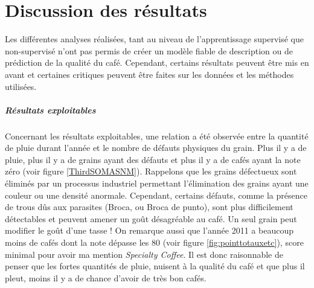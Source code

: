 \chapter{Discussion des résultats}










Les différentes analyses réalisées, tant au niveau de l'apprentissage supervisé que non-supervisé n'ont pas permis de créer un modèle fiable de description ou de prédiction de la qualité du café. Cependant, certains résultats peuvent être mis en avant et certaines critiques peuvent être faites sur les données et les méthodes utilisées. \\

\paragraph{Résultats exploitables} Concernant les résultats exploitables, une relation a été observée entre la quantité de pluie durant l'année et le nombre de défauts physiques du grain. Plus il y a de pluie, plus il y a de grains ayant des défauts et plus il y a de cafés ayant la note zéro (voir figure \ref{ThirdSOMASNM}). Rappelons que les grains défectueux sont éliminés par un processus industriel permettant l'élimination des grains ayant une couleur ou une densité anormale. Cependant, certains défauts, comme la présence de trous dûs aux parasites (Broca, ou Broca de punto), sont plus difficilement détectables et peuvent amener un goût désagréable au café. Un seul grain peut modifier le goût d'une tasse ! On remarque aussi que l'année 2011 a beaucoup moins de cafés dont la note dépasse les 80 (voir figure \ref{fig:pointtotauxetc}), score minimal pour avoir ma mention \textit{Specialty Coffee}. Il est donc raisonnable de penser que les fortes quantités de pluie, nuisent à la qualité du café et que plus il pleut, moins il y a de chance d'avoir de très bon cafés.  \\



